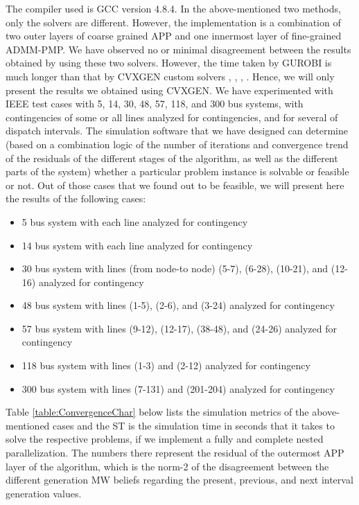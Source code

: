 \documentclass[preprint,12pt,3p]{elsarticle}
\begin{document}
	The compiler used is GCC version 4.8.4. In the above-mentioned two methods, only the solvers are different. However, the implementation is a combination of two outer layers of coarse grained APP and one innermost layer of fine-grained ADMM-PMP. We have observed no or minimal disagreement between the results obtained by using these two solvers. However, the time taken by GUROBI is much longer than that by CVXGEN custom solvers \cite{cvxgen01}, \cite{cvxgen02}, \cite{cvxgen03}, \cite{cvxgen04}. Hence, we will only present the results we obtained using CVXGEN. We have experimented with IEEE test cases with 5, 14, 30, 48, 57, 118, and 300 bus systems, with contingencies of some or all lines analyzed for contingencies, and for several of dispatch intervals. The simulation software that we have designed can determine (based on a combination logic of the number of iterations and convergence trend of the residuals of the different stages of the algorithm, as well as the different parts of the system) whether a particular problem instance is solvable or feasible or not. Out of those cases that we found out to be feasible, we will present here the results of the following cases:\\
	\begin{itemize}
		\item 5 bus system with each line analyzed for contingency
		\item 14 bus system with each line analyzed for contingency
		\item 30 bus system with lines (from node-to node) (5-7), (6-28), (10-21), and (12-16) analyzed for contingency
		\item 48 bus system with lines (1-5), (2-6), and (3-24) analyzed for contingency
		\item 57 bus system with lines (9-12), (12-17), (38-48), and (24-26) analyzed for contingency
		\item 118 bus system with lines (1-3) and (2-12) analyzed for contingency
		\item 300 bus system with lines (7-131) and (201-204) analyzed for contingency
	\end{itemize}
	Table \ref{table:ConvergenceChar} below lists the simulation metrics of the above-mentioned cases and the ST is the simulation time in seconds that it takes to solve the respective problems, if we implement a fully and complete nested parallelization. The numbers there represent the residual of the outermost APP layer of the algorithm, which is the norm-2 of the disagreement between the different generation MW beliefs regarding the present, previous, and next interval generation values. 
\end{document}
